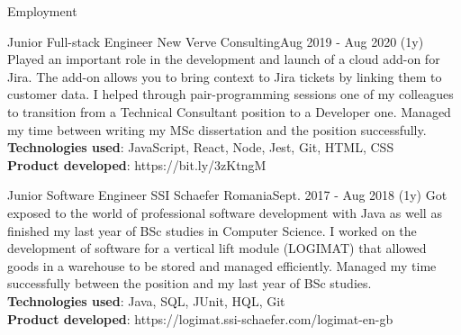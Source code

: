 \documentclass[]{mcdowellcv}
\begin{document}
\begin{cvsection}{Employment}
		\begin{cvsubsection}{Junior Full-stack Engineer }{New Verve Consulting}{Aug 2019 - Aug 2020 (1y)} 
			\hspace{\parindent} \hspace{\parindent} \hspace{\parindent} \hspace{\parindent} Played an important role in the development and launch of a cloud add-on for Jira. The add-on allows you to bring context to Jira tickets by linking them to customer data. I helped through pair-programming sessions one of my colleagues to transition from a Technical Consultant position to a Developer one. Managed my time between writing my MSc dissertation and the position successfully.
      		\\ \textbf{Technologies used}: JavaScript, React, Node, Jest, Git, HTML, CSS
	  		\\ \textbf{Product developed}: https://bit.ly/3zKtngM
		\end{cvsubsection}


		\begin{cvsubsection}{Junior Software Engineer }{SSI Schaefer Romania}{Sept. 2017 - Aug 2018 (1y)}
			\hspace{\parindent} \hspace{\parindent} \hspace{\parindent} \hspace{\parindent}  Got exposed to the world of professional software development with Java as well as finished my last year of BSc studies in Computer Science. I worked on the development of software for a vertical lift module (LOGIMAT) that allowed goods in a warehouse to be stored and managed efficiently. Managed my time successfully between the position and my last year of BSc studies.
      		\\ \textbf{Technologies used}: Java, SQL, JUnit, HQL, Git
		    \\ \textbf{Product developed}: https://logimat.ssi-schaefer.com/logimat-en-gb
		\end{cvsubsection}
		
  \end{cvsection}
\end{document}
